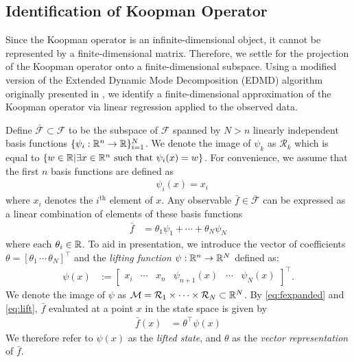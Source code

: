 \subsection{Identification of Koopman Operator}
\label{sec:koopid}

Since the Koopman operator is an infinite-dimensional object, it cannot be represented by a finite-dimensional matrix. 
Therefore, we settle for the projection of the Koopman operator onto a finite-dimensional subspace.
Using a modified version of the Extended Dynamic Mode Decomposition (EDMD) algorithm \cite{williams2015data} originally presented in \cite{mauroy2016linear,mauroy2017koopman}, we identify a finite-dimensional approximation of the Koopman operator via linear regression applied to the observed data.

Define ${\bar{\mathcal{F}} \subset \mathcal{F}}$ to be the subspace of $\mathcal{F}$ spanned by ${N>n}$ linearly independent basis functions 
${ \{ \psi_i : \mathbb{R}^n \to \mathbb{R} \}_{i=1}^N}$.
We denote the image of $\psi_k$ as $ \mathcal{R}_k$ which is equal to $\{ w \in \mathbb{R} | \exists x \in \mathbb{R}^n \text{ such that } \psi_i(x) = w  \}$.
For convenience, we assume that the first $n$ basis functions are defined as
\begin{align}
    &\psi_i(x) = x_i
    \label{eq:xinpsi}
\end{align}
where $x_i$ denotes the $i^{\text{th}}$ element of $x$.
Any observable $\bar{f} \in \bar{\mathcal{F}}$ can be expressed as a linear combination of elements of these basis functions
\begin{align}
    \bar{f} &= \theta_1 \psi_1 + \cdots + \theta_N \psi_N
    \label{eq:fexpanded}
\end{align}
where each $\theta_i \in \mathbb{R}$.
To aid in presentation, we introduce the vector of coefficients ${\theta = [ \theta_1 \,  \cdots \, \theta_N ]^\top}$ and the \emph{lifting function} ${\psi : \mathbb{R}^n \to \mathbb{R}^N}$ defined as:
\begin{align}
    \psi(x) &:= \begin{bmatrix} x_i & \cdots & x_n & \psi_{n+1} (x) & \cdots & \psi_N (x) \end{bmatrix}^\top.
    \label{eq:lift}
\end{align}
We denote the image of $\psi$ as $\mathcal{M} = \mathcal{R}_1 \times \cdots \times \mathcal{R}_N \subset \mathbb{R}^N$.
By \eqref{eq:fexpanded} and \eqref{eq:lift}, $\bar{f}$ evaluated at a point $x$ in the state space is given by
\begin{align}
    \bar{f}(x) &= \theta^\top \psi (x)
    \label{eq:fvec}
\end{align}
We therefore refer to $\psi(x)$ as the \emph{lifted state}, and $\theta$ as the \emph{vector representation} of $\bar{f}$.

